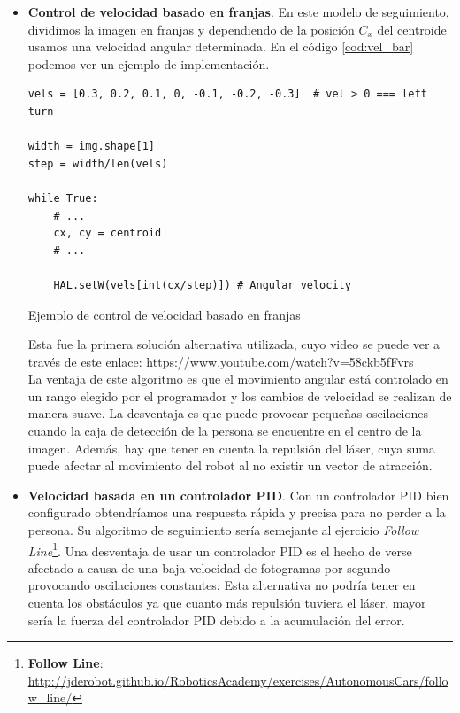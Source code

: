 \begin{itemize}
	\item \textbf{Control de velocidad basado en franjas}. En este modelo de seguimiento, dividimos la imagen en franjas y dependiendo de la posición $C_{x}$ del centroide usamos una velocidad angular determinada. En el código \ref{cod:vel_bar} podemos ver un ejemplo de implementación.
\begin{code}[H]
\begin{lstlisting}
vels = [0.3, 0.2, 0.1, 0, -0.1, -0.2, -0.3]	 # vel > 0 === left turn

width = img.shape[1]
step = width/len(vels)

while True:
	# ...
	cx, cy = centroid
	# ...
	
	HAL.setW(vels[int(cx/step)]) # Angular velocity
\end{lstlisting}
\caption{Ejemplo de control de velocidad basado en franjas}
\label{cod:vel_bar}
\end{code}
	Esta fue la primera solución alternativa utilizada, cuyo video se puede ver a través de este enlace: \url{https://www.youtube.com/watch?v=58ckb5fFvrs}\\
	La ventaja de este algoritmo es que el movimiento angular está controlado en un rango elegido por el programador y los cambios de velocidad se realizan de manera suave. La desventaja es que puede provocar pequeñas oscilaciones cuando la caja de detección de la persona se encuentre en el centro de la imagen. Además, hay que tener en cuenta la repulsión del láser, cuya suma puede afectar al movimiento del robot al no existir un vector de atracción.
	
	\item \textbf{Velocidad basada en un controlador PID}. Con un controlador PID bien configurado obtendríamos una respuesta rápida y precisa para no perder a la persona. Su algoritmo de seguimiento sería semejante al ejercicio \textit{Follow Line}\footnote{\textbf{Follow Line}: \url{http://jderobot.github.io/RoboticsAcademy/exercises/AutonomousCars/follow_line/}}. Una desventaja de usar un controlador PID es el hecho de verse afectado a causa de una baja velocidad de fotogramas por segundo provocando oscilaciones constantes. Esta alternativa no podría tener en cuenta los obstáculos ya que cuanto más repulsión tuviera el láser, mayor sería la fuerza del controlador PID debido a la acumulación del error.
	

\end{itemize}
